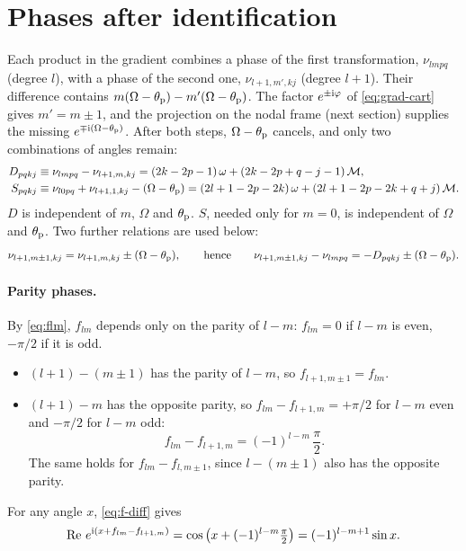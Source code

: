 \section{Phases after identification}
Each product in the gradient combines a phase of the first transformation, $\nu_{lmpq}$ (degree $l$), with a phase of the second one, $\nu_{l+1,m',kj}$ (degree $l+1$). Their difference contains $m(\Omega-\theta_{\mathrm p})-m'(\Omega-\theta_{\mathrm p})$. The factor $e^{\pm\mathrm{i}\varphi}$ of \eqref{eq:grad-cart} gives $m'=m\pm1$, and the projection on the nodal frame (next section) supplies the missing $e^{\mp\mathrm{i}(\Omega-\theta_{\mathrm p})}$. After both steps, $\Omega-\theta_{\mathrm p}$ cancels, and only two combinations of angles remain:
\begin{align}
  D_{pqkj}&\equiv\nu_{lmpq}-\nu_{l+1,m,kj}=(2k-2p-1)\,\omega+(2k-2p+q-j-1)\,\mathcal{M}, \label{eq:D}\\
  S_{pqkj}&\equiv\nu_{l0pq}+\nu_{l+1,1,kj}-(\Omega-\theta_{\mathrm p})=(2l+1-2p-2k)\,\omega+(2l+1-2p-2k+q+j)\,\mathcal{M}. \label{eq:S}
\end{align}
$D$ is independent of $m$, $\Omega$ and $\theta_{\mathrm p}$. $S$, needed only for $m=0$, is independent of $\Omega$ and $\theta_{\mathrm p}$. Two further relations are used below:
\begin{equation}
  \nu_{l+1,m\pm1,kj}=\nu_{l+1,m,kj}\pm(\Omega-\theta_{\mathrm p}),\qquad\text{hence}\qquad \nu_{l+1,m\pm1,kj}-\nu_{lmpq}=-D_{pqkj}\pm(\Omega-\theta_{\mathrm p}). \label{eq:nu-shift}
\end{equation}

\paragraph{Parity phases.} By \eqref{eq:flm}, $f_{lm}$ depends only on the parity of $l-m$: $f_{lm}=0$ if $l-m$ is even, $-\pi/2$ if it is odd.
\begin{itemize}
  \item $(l+1)-(m\pm1)$ has the parity of $l-m$, so $f_{l+1,m\pm1}=f_{lm}$.
  \item $(l+1)-m$ has the opposite parity, so $f_{lm}-f_{l+1,m}=+\pi/2$ for $l-m$ even and $-\pi/2$ for $l-m$ odd:
  \begin{equation}
    f_{lm}-f_{l+1,m}=(-1)^{l-m}\,\frac{\pi}{2}. \label{eq:f-diff}
  \end{equation}
  The same holds for $f_{lm}-f_{l,m\pm1}$, since $l-(m\pm1)$ also has the opposite parity.
\end{itemize}
For any angle $x$, \eqref{eq:f-diff} gives
\begin{equation}
  \operatorname{Re}\,e^{\mathrm{i}(x+f_{lm}-f_{l+1,m})}=\cos\big(x+(-1)^{l-m}\tfrac\pi2\big)=(-1)^{l-m+1}\sin x. \label{eq:re-shift}
\end{equation}


